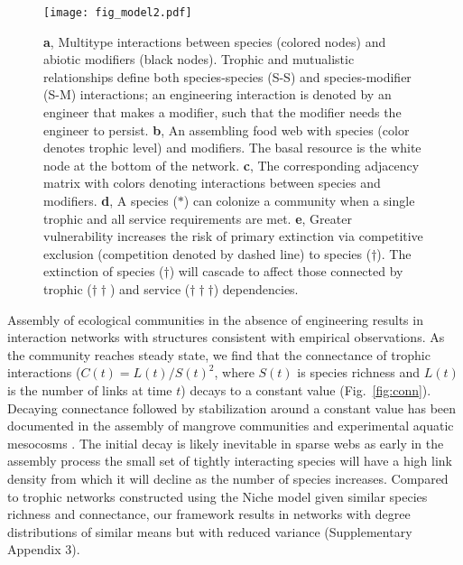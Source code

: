 \documentclass[twocolumn,preprintnumbers,amsmath,amssymb,superscriptaddress,linenumbers]{revtex4-1}
\begin{document}
\begin{figure}[h!]
\centering
\texttt{[image: fig\_model2.pdf]}
\vspace{0mm}
\caption{
\textbf{a}, Multitype interactions between species (colored nodes) and abiotic modifiers (black nodes).
Trophic and mutualistic relationships define both species-species (S-S) and species-modifier (S-M) interactions; an engineering interaction is denoted by an engineer that makes a modifier, such that the modifier needs the engineer to persist.
\textbf{b}, An assembling food web with species (color denotes trophic level) and modifiers. The basal resource is the white node at the bottom of the network.
\textbf{c}, The corresponding adjacency matrix with colors denoting interactions between species and modifiers.
\textbf{d}, A species ($\ast$) can colonize a community when a single trophic and all service requirements are met.
\textbf{e}, Greater vulnerability increases the risk of primary extinction via competitive exclusion (competition denoted by dashed line) to species ($\dag$).
The extinction of species ($\dag$) will cascade to affect those connected by trophic ($\dag \dag$) and service ($\dag \dag \dag$) dependencies. 
\vspace{-3mm}
}
\vspace{0mm}
\label{fig:model}
\end{figure}

Assembly of ecological communities in the absence of engineering results in interaction networks with structures consistent with empirical observations.
As the community reaches steady state, we find that the connectance of trophic interactions ($C(t)=L(t)/S(t)^2$, where $S(t)$ is species richness and $L(t)$ is the number of links at time $t$) decays to a constant value (Fig.\ \ref{fig:conn}). %
Decaying connectance followed by stabilization around a constant value has been documented in the assembly of mangrove communities \cite{Piechnik2008} and experimental aquatic mesocosms \cite{Fahimipour2014}. 
The initial decay is likely inevitable in sparse webs as early in the assembly process the small set of tightly interacting species will have a high link density from which it will decline as the number of species increases.
Compared to trophic networks constructed using the Niche model \cite{Williams2000} given similar species richness and connectance, our framework results in networks with degree distributions of similar means but with reduced variance (Supplementary Appendix 3).
\end{document}
